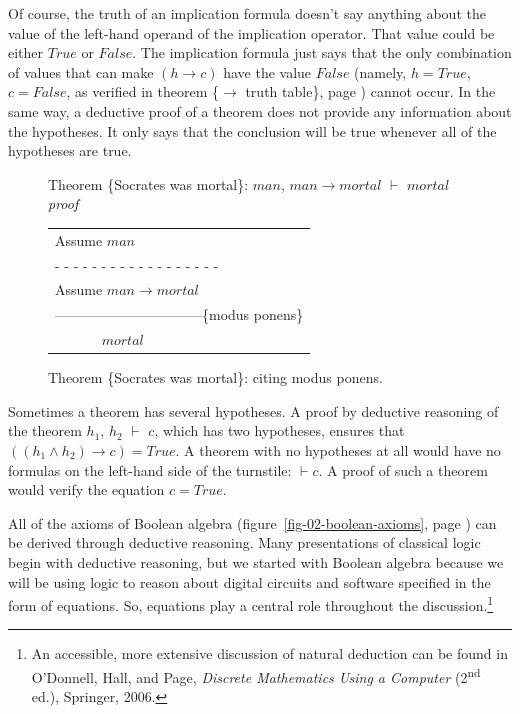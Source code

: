 Of course, the truth of an implication formula doesn't
say anything about the value of the
left-hand operand of the implication operator.
That value could be either $True$ or $False$.
The implication formula just says that
the only combination of values that can make
$(h \rightarrow c)$ have the value $False$
(namely, $h = True$, $c = False$, as verified in
theorem \{$\rightarrow$ truth table\},
page \pageref{implication-truth-table}) cannot occur.
In the same way, a deductive proof of a theorem
does not provide any information about the hypotheses.
It only says that the conclusion will be true
whenever all of the hypotheses are true.

\begin{figure}
Theorem \{Socrates was mortal\}: $man$, $man \rightarrow mortal$ $\vdash$ $mortal$ \\
\emph{proof}
\begin{center}
\begin{spacing}{0.9}
\begin{tabular}{l}
Assume $man$                    \\
 - - - - - - - - - - - - - - - - - -\\
Assume $man \rightarrow mortal$ \\
--------------------------------\{modus ponens\} \\
~~~~~~ $mortal$                 \\
\end{tabular}
\end{spacing}
\end{center}
\caption{Theorem \{Socrates was mortal\}: citing modus ponens.}
\label{fig:socrates-proof}
\end{figure}

Sometimes a theorem has several hypotheses.
A proof by deductive reasoning of the theorem
$h_1$, $h_2$ $\vdash$ $c$,
which has two hypotheses,
ensures that
$((h_1 \wedge h_2) \rightarrow c) = True$.
A theorem with no hypotheses at all
would have no formulas on the left-hand side of the turnstile:
$\vdash c$.
A proof of such a theorem would
verify the equation $c = True$.

All of the axioms of Boolean algebra
(figure~\ref{fig-02-boolean-axioms}, page \pageref{fig-02-boolean-axioms})
can be derived through deductive reasoning.
Many presentations of classical logic begin with
deductive reasoning,
but we started with Boolean algebra
because we will be using logic to reason about
digital circuits and software specified in the form of equations.
So, equations play a central role throughout the
discussion.\footnote{An accessible,
more extensive discussion of natural deduction can be found
in O'Donnell, Hall, and Page,
\emph{Discrete Mathematics Using a Computer}
(2\textsuperscript{nd} ed.), Springer, 2006.}

